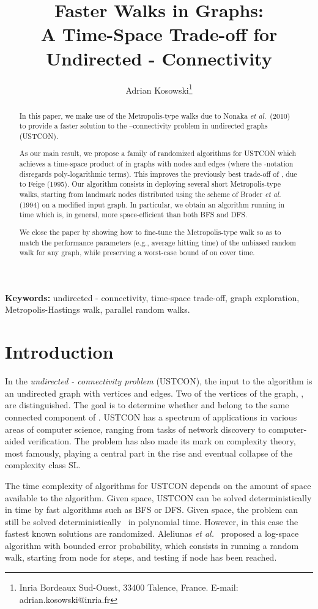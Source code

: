 \documentclass[11pt,a4paper]{article}
\author{Adrian Kosowski\footnote{Inria Bordeaux Sud-Ouest, 33400 Talence, France. E-mail: adrian.kosowski@inria.fr}}
\title{Faster Walks in Graphs:\\ A  Time-Space Trade-off for Undirected - Connectivity}
\date{}
\newcommand{\etal}{\textsl{et al.}\xspace}
\renewcommand{\*}{\hspace*{5mm}}
\begin{document}
\maketitle\thispagestyle{empty}
\setcounter{page}{0}
\vspace{8mm}

\begin{abstract}
\noindent
In this paper, we make use of the Metropolis-type walks due to Nonaka \etal\ (2010) to provide a faster solution to the --connectivity problem in undirected graphs (USTCON).

As our main result, we propose a family of randomized algorithms for USTCON which achieves a time-space product of  in graphs with  nodes and  edges (where the -notation disregards poly-logarithmic terms). This improves the previously best trade-off of , due to Feige (1995). Our algorithm consists in deploying several short Metropolis-type walks, starting from landmark nodes distributed using the scheme of Broder \etal (1994) on a modified input graph. In particular, we obtain an algorithm running in time  which is, in general, more space-efficient than both BFS and DFS. 

We close the paper by showing how to fine-tune the Metropolis-type walk so as to match the performance parameters (e.g., average hitting time) of the unbiased random walk for any graph, while preserving a worst-case bound of  on cover time.
\end{abstract}
\vspace{8mm}
\textbf{Keywords:} undirected - connectivity, time-space trade-off, graph exploration, Metropolis-Hastings walk, parallel random walks.
\newpage

\section{Introduction}

In the \emph{undirected - connectivity problem} (USTCON), the input to the algorithm is an undirected graph  with  vertices and  edges. Two of the vertices of the graph, , are distinguished. The goal is to determine whether  and  belong to the same connected component of . USTCON has a spectrum of applications in various areas of computer science, ranging from tasks of network discovery to computer-aided verification. The problem has also made its mark on complexity theory, most famously, playing a central part in the rise and eventual collapse of the complexity class SL.

The time complexity of algorithms for USTCON depends on the amount of space available to the algorithm. Given  space, USTCON can be solved deterministically in time  by fast algorithms such as BFS or DFS. Given  space, the problem can still be solved deterministically~\cite{Rei} in polynomial time. However, in this case the fastest known solutions are randomized. Aleliunas \etal~\cite{AKLLR} proposed a log-space algorithm with bounded error probability, which consists in running a random walk, starting from node  for  steps, and testing if node  has been reached. 
\end{document}
